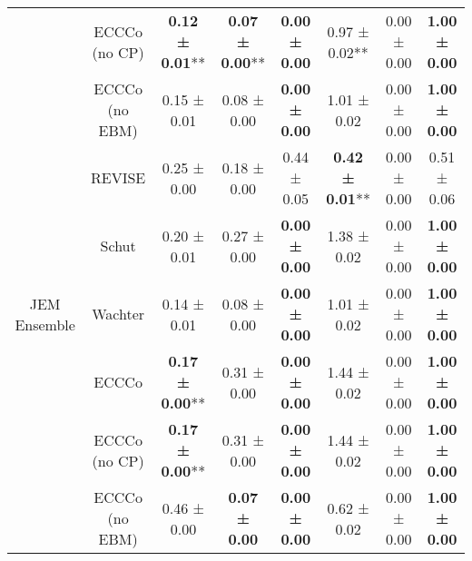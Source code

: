 \begin{table}
{\begin{tabular}[t]{cccccccc}
 & ECCCo (no CP) & \textbf{0.12 ± 0.01}** & \textbf{0.07 ± 0.00}** & \textbf{0.00 ± 0.00}\hphantom{*}\hphantom{*} & 0.97 ± 0.02** & 0.00 ± 0.00\hphantom{*}\hphantom{*} & \textbf{1.00 ± 0.00}\hphantom{*}\hphantom{*}\\

 & ECCCo (no EBM) & 0.15 ± 0.01\hphantom{*}\hphantom{*} & 0.08 ± 0.00\hphantom{*}\hphantom{*} & \textbf{0.00 ± 0.00}\hphantom{*}\hphantom{*} & 1.01 ± 0.02\hphantom{*}\hphantom{*} & 0.00 ± 0.00\hphantom{*}\hphantom{*} & \textbf{1.00 ± 0.00}\hphantom{*}\hphantom{*}\\

 & REVISE & 0.25 ± 0.00\hphantom{*}\hphantom{*} & 0.18 ± 0.00\hphantom{*}\hphantom{*} & 0.44 ± 0.05\hphantom{*}\hphantom{*} & \textbf{0.42 ± 0.01}** & 0.00 ± 0.00\hphantom{*}\hphantom{*} & 0.51 ± 0.06\hphantom{*}\hphantom{*}\\

 & Schut & 0.20 ± 0.01\hphantom{*}\hphantom{*} & 0.27 ± 0.00\hphantom{*}\hphantom{*} & \textbf{0.00 ± 0.00}\hphantom{*}\hphantom{*} & 1.38 ± 0.02\hphantom{*}\hphantom{*} & 0.00 ± 0.00\hphantom{*}\hphantom{*} & \textbf{1.00 ± 0.00}\hphantom{*}\hphantom{*}\\

\multirow[t]{-6}{*}{\centering\arraybackslash JEM Ensemble} & Wachter & 0.14 ± 0.01\hphantom{*}\hphantom{*} & 0.08 ± 0.00\hphantom{*}\hphantom{*} & \textbf{0.00 ± 0.00}\hphantom{*}\hphantom{*} & 1.01 ± 0.02\hphantom{*}\hphantom{*} & 0.00 ± 0.00\hphantom{*}\hphantom{*} & \textbf{1.00 ± 0.00}\hphantom{*}\hphantom{*}\\
\cmidrule{1-8}
 & ECCCo & \textbf{0.17 ± 0.00}** & 0.31 ± 0.00\hphantom{*}\hphantom{*} & \textbf{0.00 ± 0.00}\hphantom{*}\hphantom{*} & 1.44 ± 0.02\hphantom{*}\hphantom{*} & 0.00 ± 0.00\hphantom{*}\hphantom{*} & \textbf{1.00 ± 0.00}\hphantom{*}\hphantom{*}\\

 & ECCCo (no CP) & \textbf{0.17 ± 0.00}** & 0.31 ± 0.00\hphantom{*}\hphantom{*} & \textbf{0.00 ± 0.00}\hphantom{*}\hphantom{*} & 1.44 ± 0.02\hphantom{*}\hphantom{*} & 0.00 ± 0.00\hphantom{*}\hphantom{*} & \textbf{1.00 ± 0.00}\hphantom{*}\hphantom{*}\\

 & ECCCo (no EBM) & 0.46 ± 0.00\hphantom{*}\hphantom{*} & \textbf{0.07 ± 0.00}\hphantom{*}\hphantom{*} & \textbf{0.00 ± 0.00}\hphantom{*}\hphantom{*} & 0.62 ± 0.02\hphantom{*}\hphantom{*} & 0.00 ± 0.00\hphantom{*}\hphantom{*} & \textbf{1.00 ± 0.00}\hphantom{*}\hphantom{*}\\


\end{tabular}}
\end{table}
